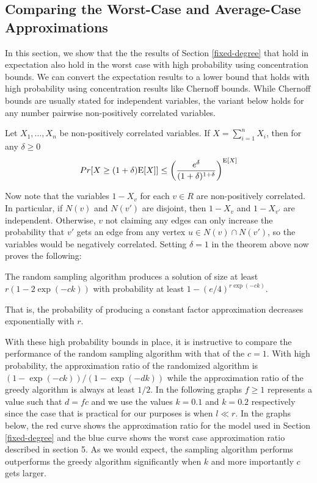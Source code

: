 \label{worst-vs-avg}
\subsection{Comparing the Worst-Case and Average-Case Approximations}
In this section, we show that the the results of Section
\ref{fixed-degree} that hold in expectation also hold in the worst
case with high probability using concentration bounds. We can convert 
the expectation results to a lower bound that holds with high
probability using concentration results like Chernoff bounds. While
Chernoff bounds are usually stated for independent variables, the 
variant below holds for any number pairwise non-positively correlated
variables.

\begin{thm}
Let $X_1,\ldots, X_n$ be non-positively correlated variables. If $X=\sum_{i=1}^n X_i$, then for any $\delta\geq 0$
\[ Pr[X \geq (1+\delta)\text{E}[X] ] \leq \left(\frac{e^\delta}{(1+\delta)^{1+\delta}}\right)^{\text{E}[X]} \]
\end{thm}

Now note that the variables $1-X_v$ for each $v\in R$ are
non-positively correlated. In particular, if $N(v)$ and $N(v')$ are
disjoint, then $1-X_v$ and $1-X_{v'}$ are independent. Otherwise, $v$
not claiming any edges can only increase the probability that $v'$
gets an edge from any vertex $u\in N(v)\cap N(v')$, so the variables
would be negatively correlated. Setting $\delta=1$ in the
theorem above now proves the following:

\begin{thm}
The random sampling algorithm produces a solution of size at least $r(1-2\exp(-ck))$ with probability at least $1-(e/4)^{r\exp(-ck)}$.
\end{thm}

That is, the probability of producing a constant factor approximation decreases exponentially with $r$.

With these high probability bounds in place, it is instructive to
compare the performance of the random sampling algorithm with that of
the $c=1$. With high probability, the approximation ratio of the
randomized algorithm is $(1-\exp(-ck))/(1-\exp(-dk))$ while the
approximation ratio of the greedy algorithm is always at least
$1/2$. In the following graphs $f\geq 1$ represents a value such that
$d=fc$ and we use the values $k=0.1$ and $k=0.2$ respectively since
the case that is practical for our purposes is when $l \ll r$. In the
graphs below, the red curve shows the approximation ratio for the
model used in Section \ref{fixed-degree} and the blue curve shows the
worst case approximation ratio described in section 5. As we would
expect, the sampling algorithm performs outperforms the greedy
algorithm significantly when $k$ and more importantly $c$ gets larger.

